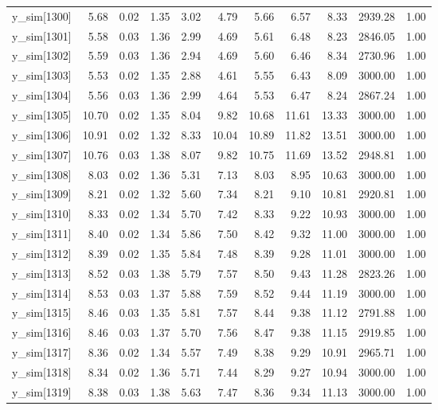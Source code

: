 \begin{table}[ht]
\begin{tabular}{rrrrrrrrrrr}
  y\_sim[1300] & 5.68 & 0.02 & 1.35 & 3.02 & 4.79 & 5.66 & 6.57 & 8.33 & 2939.28 & 1.00 \\ 
  y\_sim[1301] & 5.58 & 0.03 & 1.36 & 2.99 & 4.69 & 5.61 & 6.48 & 8.23 & 2846.05 & 1.00 \\ 
  y\_sim[1302] & 5.59 & 0.03 & 1.36 & 2.94 & 4.69 & 5.60 & 6.46 & 8.34 & 2730.96 & 1.00 \\ 
  y\_sim[1303] & 5.53 & 0.02 & 1.35 & 2.88 & 4.61 & 5.55 & 6.43 & 8.09 & 3000.00 & 1.00 \\ 
  y\_sim[1304] & 5.56 & 0.03 & 1.36 & 2.99 & 4.64 & 5.53 & 6.47 & 8.24 & 2867.24 & 1.00 \\ 
  y\_sim[1305] & 10.70 & 0.02 & 1.35 & 8.04 & 9.82 & 10.68 & 11.61 & 13.33 & 3000.00 & 1.00 \\ 
  y\_sim[1306] & 10.91 & 0.02 & 1.32 & 8.33 & 10.04 & 10.89 & 11.82 & 13.51 & 3000.00 & 1.00 \\ 
  y\_sim[1307] & 10.76 & 0.03 & 1.38 & 8.07 & 9.82 & 10.75 & 11.69 & 13.52 & 2948.81 & 1.00 \\ 
  y\_sim[1308] & 8.03 & 0.02 & 1.36 & 5.31 & 7.13 & 8.03 & 8.95 & 10.63 & 3000.00 & 1.00 \\ 
  y\_sim[1309] & 8.21 & 0.02 & 1.32 & 5.60 & 7.34 & 8.21 & 9.10 & 10.81 & 2920.81 & 1.00 \\ 
  y\_sim[1310] & 8.33 & 0.02 & 1.34 & 5.70 & 7.42 & 8.33 & 9.22 & 10.93 & 3000.00 & 1.00 \\ 
  y\_sim[1311] & 8.40 & 0.02 & 1.34 & 5.86 & 7.50 & 8.42 & 9.32 & 11.00 & 3000.00 & 1.00 \\ 
  y\_sim[1312] & 8.39 & 0.02 & 1.35 & 5.84 & 7.48 & 8.39 & 9.28 & 11.01 & 3000.00 & 1.00 \\ 
  y\_sim[1313] & 8.52 & 0.03 & 1.38 & 5.79 & 7.57 & 8.50 & 9.43 & 11.28 & 2823.26 & 1.00 \\ 
  y\_sim[1314] & 8.53 & 0.03 & 1.37 & 5.88 & 7.59 & 8.52 & 9.44 & 11.19 & 3000.00 & 1.00 \\ 
  y\_sim[1315] & 8.46 & 0.03 & 1.35 & 5.81 & 7.57 & 8.44 & 9.38 & 11.12 & 2791.88 & 1.00 \\ 
  y\_sim[1316] & 8.46 & 0.03 & 1.37 & 5.70 & 7.56 & 8.47 & 9.38 & 11.15 & 2919.85 & 1.00 \\ 
  y\_sim[1317] & 8.36 & 0.02 & 1.34 & 5.57 & 7.49 & 8.38 & 9.29 & 10.91 & 2965.71 & 1.00 \\ 
  y\_sim[1318] & 8.34 & 0.02 & 1.36 & 5.71 & 7.44 & 8.29 & 9.27 & 10.94 & 3000.00 & 1.00 \\ 
  y\_sim[1319] & 8.38 & 0.03 & 1.38 & 5.63 & 7.47 & 8.36 & 9.34 & 11.13 & 3000.00 & 1.00 \\ 

\end{tabular}
\end{table}
